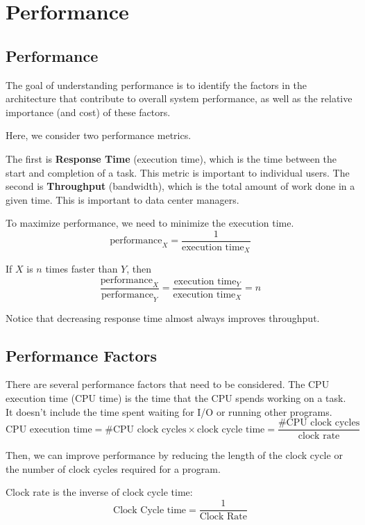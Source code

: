 \chapter{Performance}

\section{Performance}
The goal of understanding performance is to identify the factors in the architecture that contribute to overall system performance, as well as the relative importance (and cost) of these factors.

Here, we consider two performance metrics. 

The first is \textbf{Response Time} (execution time), which is the time between the start and completion of a task. This metric is important to individual users. The second is \textbf{Throughput} (bandwidth), which is the total amount of work done in a given time. This is important to data center managers.

To maximize performance, we need to minimize the execution time.
\[
  \text{performance}_X = \dfrac{1}{\text{execution time}_X}
\]

If \(X\) is \(n\) times faster than \(Y\), then
\[
  \dfrac{\text{performance}_X}{\text{performance}_Y} = \dfrac{\text{execution time}_Y}{\text{execution time}_X} = n
\]

Notice that decreasing response time almost always improves throughput.

\section{Performance Factors}
There are several performance factors that need to be considered. The CPU execution time (CPU time) is the time that the CPU spends working on a task. It doesn't include the time spent waiting for I/O or running other programs.
\[
  \text{CPU execution time} = \text{\# CPU clock cycles} \times \text{clock cycle time} = \dfrac{\text{\# CPU clock cycles}}{\text{clock rate}}
\]

Then, we can improve performance by reducing the length of the clock cycle or the number of clock cycles required for a program.

\begin{remark}
  Clock rate is the inverse of clock cycle time: 
  \[
    \text{Clock Cycle time} = \dfrac{1}{\text{Clock Rate}}
  \]
\end{remark}

